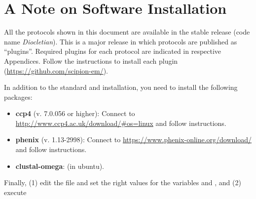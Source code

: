 \section{A Note on Software Installation}
  All the protocols shown in this document are available in the stable \scipion release  (code name \textit{Diocletian}). This is a major release in which protocols are published as ``plugins''. Required plugins for each protocol are indicated in respective Appendices. Follow the instructions to install each plugin (\url{https://github.com/scipion-em/}).


  In addition to the standard \scipion and  installation, you need to install the following packages:
  
  \begin{itemize}
   \item\textbf{ccp4} (v. 7.0.056 or higher): Connect to \url{http://www.ccp4.ac.uk/download/#os=linux} and follow instructions.
   \item\textbf{phenix} (v. 1.13-2998): Connect to \url{https://www.phenix-online.org/download/} and follow instructions.
   \item\textbf{clustal-omega}:  (in ubuntu).
  \end{itemize}

  
  Finally, (1) edit the file  and set the right values for the variables  and , and (2) execute 
